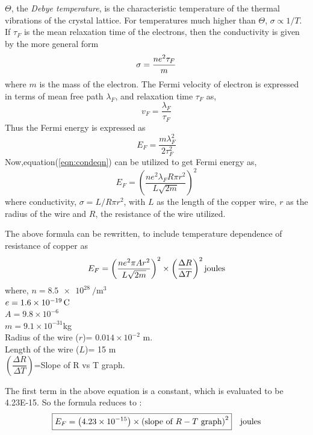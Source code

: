 	$\Theta$, the \emph{Debye temperature}, is the characteristic temperature of the thermal vibrations of the crystal lattice. For temperatures much higher than $\Theta$, $\sigma \propto 1/T$. 
	If $\tau_{F}$ is the mean relaxation time of the electrons, then the conductivity is given by the more general form
	\begin{equation}{\label{eqn:condeqn}}
		\sigma=\frac{n e^{2} \tau_{F}}{m} 
	\end{equation}
	where $m$ is the mass of the electron. The Fermi velocity of electron is expressed in terms of mean free path $\lambda_{F}$, and relaxation time $\tau_{F}$ as,
	\begin{equation}\label{eqn:Fermi-velocity}
		v_F = \frac{\lambda_{F}}{\tau_F}   
	\end{equation}
	Thus the Fermi energy is expressed as
	\begin{equation}\label{eqn:FermiEnergy1}
		E_{F}=\frac{m\lambda_{F}^2}{2\tau_{F}^2}   
	\end{equation}
	Now,equation(\ref{eqn:condeqn}) can be utilized to get Fermi energy as,
	\begin{equation}\label{eqn:FermiEnergy2}
		E_{F}= \left(\frac{ne^2\lambda_{F}R\pi r^2}{L\sqrt{2m}}\right)^2   
	\end{equation} 
	where conductivity, $\sigma=L/{R\pi r^2}$, with $L$ as the length of the copper wire, $r$ as the radius of the wire and $R$, the resistance of the wire utilized.
	
	The above formula can be rewritten, to include temperature dependence of resistance of copper as
	\begin{equation}{\label{eqn:FermiEnergy-MAIN}}
		E_{F}=\left(\frac{ne^2\pi Ar^2}{L\sqrt{2m}}\right)^2 \times \left(\dfrac{\Delta R}{\Delta T}\right)^2 \text{joules}
	\end{equation}
	where, $n=\SI{8.5e28}{\per\meter\cubed}$ \\
	$e=\SI{1.6E-19}{\coulomb}$ \\
	$A=9.8\times 10^{-6}$ \\
	$m=9.1\times 10^{-31}$kg \\
	Radius of the wire ($ r $)= $0.014\times 10^{-2}$ m.\\
	Length of the wire ($ L $)= 15 m\\
	$\left(\dfrac{\Delta R}{\Delta T}\right)$=Slope of R vs T graph.
	
	The first term in the above equation is a constant, which is evaluated to be \SI{4.23E-15}{}. So the formula reduces to :
	\begin{equation}{\label{eqn:FermiEnergy-REDUCED}}
		\boxed{E_{F}=\left(4.23\times10^{-15}\right) \times \left(\text{slope of } R-T \text{ graph}\right)^2} \quad \text{joules}
	\end{equation}
	
